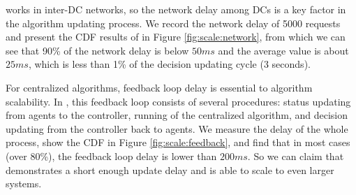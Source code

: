  \name works in inter-DC networks, so the network delay among DCs is a key factor in the algorithm updating process. We record the network delay of 5000 requests and present the CDF results of in Figure \ref{fig:scale:network}, from which we can see that 90\% of the network delay is below $50ms$ and the average value is about $25ms$, which is less than 1\% of the decision updating cycle (3 seconds).

 For centralized algorithms, feedback loop delay is essential to algorithm scalability. In \name, this feedback loop consists of several procedures: status updating from agents to the controller, running of the centralized algorithm, and decision updating from the controller back to agents. We measure the delay of the whole process, show the CDF in Figure \ref{fig:scale:feedback}, and find that in most cases (over 80\%), the feedback loop delay is lower than $200ms$. So we can claim that \name demonstrates a short enough update delay and is able to scale to even larger systems.

